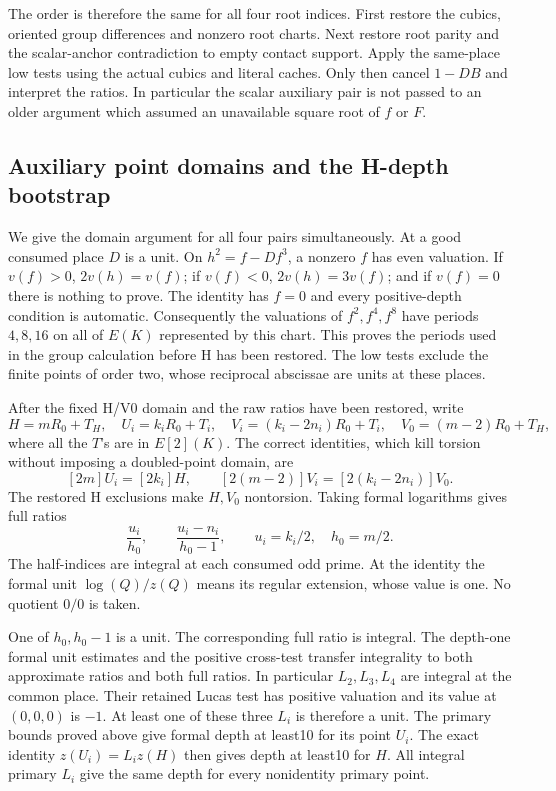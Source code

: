 The order is therefore the same for all four root indices.
First restore the cubics, oriented group differences and nonzero
root charts. Next restore root parity and the scalar-anchor
contradiction to empty contact support. Apply the same-place low
tests using the actual cubics and literal caches. Only then
cancel $1-DB$ and interpret the ratios. In particular the scalar
auxiliary pair is not passed to an older argument which assumed
an unavailable square root of $f$ or $F$.

\subsection{Auxiliary point domains and the H-depth bootstrap}
\label{subsec:v14-logarithms}
We give the domain argument for all four pairs simultaneously.
At a good consumed place $D$ is a unit. On
$h^2=f-Df^3$, a nonzero $f$ has even valuation. If $v(f)>0$,
$2v(h)=v(f)$; if $v(f)<0$, $2v(h)=3v(f)$; and if $v(f)=0$
there is nothing to prove. The identity has $f=0$ and every
positive-depth condition is automatic. Consequently the
valuations of $f^2,f^4,f^8$ have periods $4,8,16$ on all of
$E(K)$ represented by this chart. This proves the periods used
in the group calculation before H has been restored.
The low tests exclude the finite points of order two, whose
reciprocal abscissae are units at these places.

After the fixed H/V0 domain and the raw ratios have been restored,
write
\[
 H=mR_0+T_H,\quad U_i=k_iR_0+T_i,\quad
 V_i=(k_i-2n_i)R_0+T_i,\quad
 V_0=(m-2)R_0+T_H,
\]
where all the $T$'s are in $E[2](K)$. The correct identities,
which kill torsion without imposing a doubled-point domain, are
\begin{equation}\label{eq:v14-doubled-identities}
 [2m]U_i=[2k_i]H,\qquad
 [2(m-2)]V_i=[2(k_i-2n_i)]V_0.
\end{equation}
The restored H exclusions make $H,V_0$ nontorsion.
Taking formal logarithms gives full ratios
\[
 \frac{u_i}{h_0},\qquad \frac{u_i-n_i}{h_0-1},
 \qquad u_i=k_i/2,\quad h_0=m/2.
\]
The half-indices are integral at each consumed odd prime.
At the identity the formal unit
$\log(Q)/z(Q)$ means its regular extension, whose value is one.
No quotient $0/0$ is taken.

One of $h_0,h_0-1$ is a unit. The corresponding full ratio is
integral. The depth-one formal unit estimates and the positive
cross-test transfer integrality to both approximate ratios and
both full ratios. In particular $L_2,L_3,L_4$ are integral at
the common place. Their retained Lucas test has positive
valuation and its value at $(0,0,0)$ is $-1$. At least one of
these three $L_i$ is therefore a unit. The primary bounds proved
above give formal depth at least10 for its point $U_i$.
The exact identity $z(U_i)=L_i z(H)$ then gives depth at least10
for $H$. All integral primary $L_i$ give the same depth for
every nonidentity primary point.

